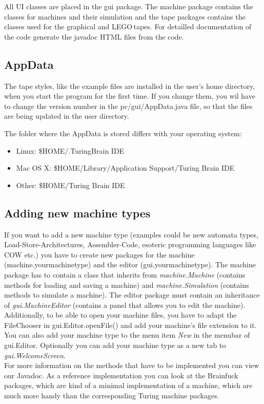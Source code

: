 \documentclass[%
  a4paper,%
  11pt,%
  blue,%
  hyperref	%
  ]{tubsartcl}
\begin{document}
All UI classes are placed in the gui package. The machine package contains the classes for machines and their simulation and the tape packages contains the classes used for the graphical and LEGO\textregistered\,tapes. For detailled documentation of the code generate the javadoc HTML files from the code.

\subsection{AppData}

The tape styles, like the example files are installed in the user's home directory, when you start the program for the first time. If you change them, you wil have to change the version number in the pc/gui/AppData.java file, so that the files are being updated in the user directory.


The folder where the AppData is stored differs with your operating system:

\begin{itemize}
\item Linux: \$HOME/.TuringBrain IDE
\item Mac OS X: \$HOME/Library/Application Support/Turing Brain IDE
\item Other: \$HOME/Turing Brain IDE
\end{itemize}

\subsection{Adding new machine types}

If you want to add a new machine type (examples could be new automata types, Load-Store-Architectures, Assembler-Code, esoteric programming languages like COW etc.) you have to create new packages for the machine (machine.yourmachinetype) and the editor (gui.yourmachinetype). The machine package has to contain a class that inherits from \emph{machine.Machine} (contains methods for loading and saving a machine) and \emph{machine.Simulation} (contains methods to simulate a machine). The editor package must contain an inheritance of \emph{gui.MachineEditor} (contains a panel that allows you to edit the machine). 
Additionally, to be able to open your machine files, you have to adapt the FileChooser in gui.Editor.openFile() and add your machine's file extension to it. \\
You can also add your machine type to the menu item \textit{New} in the menubar of gui.Editor. Optionally you can add your machine type as a new tab to \emph{gui.WelcomeScreen}.\\
For more information on the methods that have to be implemented you can view our Javadoc. As a reference implementation you can look at the Brainfuck packages, which are kind of a minimal implementation of a machine, which are much more handy than the corresponding Turing machine packages.
\end{document}
